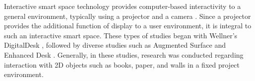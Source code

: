 \begin{comment}
In these smart space technologies, the limit restricted to 2D plane exists. Recent studies have suggested methods to realize interactive smart spaces in 3D space without this restriction \cite{grossman__2010}. To provide 3D contents on 2D planes, studies [] using a number of additional devices have been developed, but because such systems used in those studies resulted in becoming bulky and complex, it is difficult to apply them to construction sites. In particular, developed systems like \cite{weiss_benddesk:_2010, coram_astrotouch:_2013, wimmer_curve:_2010, benko_miragetable:_2012} could be used on construction sites assuming the availability of dual displays for vertical and horizontal display which can provide 2D and 3D information together. However, because vertical and horizontal displays were composed as independent displays respectively in the existing system, there was a problem of its large bulkiness. Since the proposed Port3DAr uses one projector displayed onto an 'L'-shaped space to interact with shared content, portability can be heightened.

In recent interactive smart space technology, technologies like \cite{jones_illumiroom:_2013, steimle_flexpad:_2013} that can project onto non-planar spaces have been studied well for use in homes and offices but its use is equally applicable to scenarios in complex construction environments. 
\end{comment}


Interactive smart space technology provides computer-based interactivity to a general environment, typically using a projector and a camera \cite{kane_bonfire:_2009}. Since a projector provides the additional function of display to a user environment, it is integral to such an interactive smart space. These types of studies began with Wellner's DigitalDesk \cite{wellner_digitaldesk_1991, wellner_interacting_1993}, followed by diverse studies such as Augmented Surface \cite{rekimoto_augmented_1999} and Enhanced Desk \cite{koike_integrating_2001}. Generally, in these studies, research was conducted regarding interaction with 2D objects such as books, paper, and walls in a fixed project environment.

